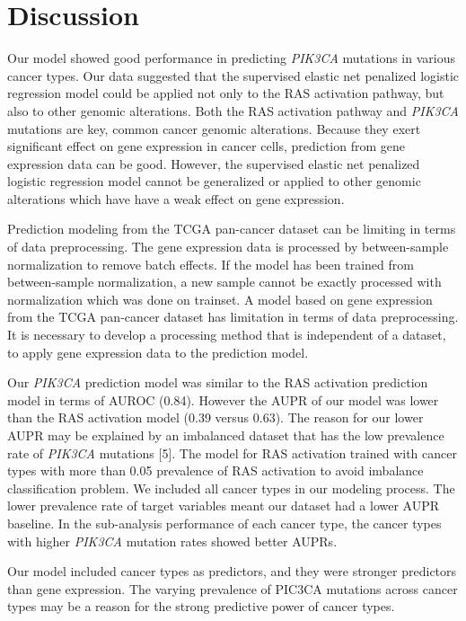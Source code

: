 \documentclass[10pt,letterpaper]{article}
\begin{document}
\hypertarget{discussion}{%
\section{Discussion}\label{discussion}}

Our model showed good performance in predicting \emph{PIK3CA} mutations
in various cancer types. Our data suggested that the supervised elastic
net penalized logistic regression model could be applied not only to the
RAS activation pathway, but also to other genomic alterations. Both the
RAS activation pathway and \emph{PIK3CA} mutations are key, common
cancer genomic alterations. Because they exert significant effect on
gene expression in cancer cells, prediction from gene expression data
can be good. However, the supervised elastic net penalized logistic
regression model cannot be generalized or applied to other genomic
alterations which have have a weak effect on gene expression.

Prediction modeling from the TCGA pan-cancer dataset can be limiting in
terms of data preprocessing. The gene expression data is processed by
between-sample normalization to remove batch effects. If the model has
been trained from between-sample normalization, a new sample cannot be
exactly processed with normalization which was done on trainset. A model
based on gene expression from the TCGA pan-cancer dataset has limitation
in terms of data preprocessing. It is necessary to develop a processing
method that is independent of a dataset, to apply gene expression data
to the prediction model.

Our \emph{PIK3CA} prediction model was similar to the RAS activation
prediction model in terms of AUROC (0.84). However the AUPR of our model
was lower than the RAS activation model (0.39 versus 0.63). The reason
for our lower AUPR may be explained by an imbalanced dataset that has
the low prevalence rate of \emph{PIK3CA} mutations {[}5{]}. The model
for RAS activation trained with cancer types with more than 0.05
prevalence of RAS activation to avoid imbalance classification problem.
We included all cancer types in our modeling process. The lower
prevalence rate of target variables meant our dataset had a lower AUPR
baseline. In the sub-analysis performance of each cancer type, the
cancer types with higher \emph{PIK3CA} mutation rates showed better
AUPRs.

Our model included cancer types as predictors, and they were stronger
predictors than gene expression. The varying prevalence of PIC3CA
mutations across cancer types may be a reason for the strong predictive
power of cancer types.
\end{document}
